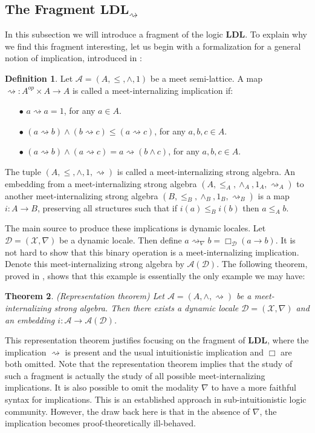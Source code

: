 \documentclass[12pt,a4paper]{article}
\theoremstyle{plain}
\newtheorem{thm}{Theorem}[section]
\theoremstyle{definition}
\newtheorem{dfn}[thm]{Definition}
\begin{document}
\subsection{The Fragment $\mathbf{LDL}_{\rightsquigarrow}$}
In this subsection we will introduce a fragment of the logic $\mathbf{LDL}$. To explain why we find this fragment interesting, let us begin with a formalization for a general notion of implication, introduced in \cite{Amir}:
\begin{dfn}
Let $\mathcal{A}=(A, \leq, \wedge, 1)$ be a meet semi-lattice. A map $\rightsquigarrow : A^{op} \times A \to A$ is called a meet-internalizing implication if:
\begin{itemize}
\item[$\bullet$]
$a \rightsquigarrow a=1$, for any $a \in A$.
\item[$\bullet$]
$(a \rightsquigarrow b) \wedge (b \rightsquigarrow c) \leq (a \rightsquigarrow c)$, for any $a, b, c \in A$.
\item[$\bullet$]
$(a \rightsquigarrow b) \wedge (a \rightsquigarrow c)= a \rightsquigarrow (b \wedge c)$, for any $a, b, c \in A$.
\end{itemize} 
The tuple $(A, \leq, \wedge, 1, \rightsquigarrow)$ is called a meet-internalizing strong algebra. An embedding from a meet-internalizing strong algebra $(A, \leq_A, \wedge_A, 1_A, \rightsquigarrow_A)$ to another meet-internalizing strong algebra $(B, \leq_B, \wedge_B, 1_B, \rightsquigarrow_B)$ is a map $i : A \to B$, preserving all structures such that if $i(a) \leq_B i(b)$ then $a \leq_A b$.
\end{dfn}
The main source to produce these implications is dynamic locales. Let $\mathcal{D}=(\mathscr{X}, \nabla)$ be a dynamic locale. Then define $a \rightsquigarrow_{\nabla} b=\Box_{\mathcal{D}}(a \to b)$. It is not hard to show that this binary operation is a meet-internalizing implication. Denote this meet-internalizing strong algebra by $\mathcal{A}(\mathcal{D})$. The following theorem, proved in \cite{Amir}, shows that this example is essentially the only example we may have:
\begin{thm}(Representation theorem)
Let $\mathcal{A}=(A, \wedge, \rightsquigarrow)$ be a meet-internalizing strong algebra. Then there exists a dynamic locale $\mathcal{D}=(\mathscr{X}, \nabla)$ and an embedding $i: \mathcal{A} \to \mathcal{A}(\mathcal{D})$.
\end{thm}

This representation theorem justifies focusing on the fragment of $\mathbf{LDL}$, where the implication $\rightsquigarrow$ is present and the usual intuitionistic implication and $\Box$ are both omitted. Note that the representation theorem implies that the study of such a fragment is actually the study of all possible meet-internalizing implications. It is also possible to omit the modality $\nabla$ to have a more faithful syntax for implications. This is an established approach in sub-intuitionistic logic community. However, the draw back here is that in the absence of $\nabla$, the implication becomes proof-theoretically ill-behaved.\\
\end{document}
